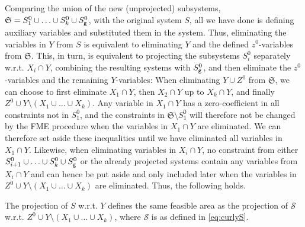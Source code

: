 \normalsize{Comparing the union of the new (unprojected) subsystems, $\mathfrak{S} = S_1^0\cup\ldots\cup S_k^0\cup S_{\texttt{g}}^0$, with the original system $S$, all we have done is defining auxiliary variables and substituted them in the system. Thus, eliminating the variables in $Y$ from $S$ is equivalent to eliminating $Y$ and the defined $z^0$-variables from $\mathfrak{S}$.} This, in turn, is equivalent to projecting the subsystems $S^0_i$ separately w.r.t. $X_i\cap Y$, combining the resulting systems with $S^0_{\texttt{g}}$, and then eliminate the $z^0$-variables and the remaining $Y$-variables: %
%
When eliminating $Y\cup Z^0$ from $\mathfrak{S}$, we can choose to first eliminate $X_1\cap Y$, then $X_2\cap Y$ up to $X_k\cap Y$, and finally $Z^0\cup Y\setminus(X_1\cup \ldots\cup X_k)$. 
Any variable in $X_1\cap Y$ has a zero-coefficient in all constraints not in $S^0_1$, and the constraints in $\mathfrak{S}\setminus S^0_1$ will therefore not be changed by the FME procedure when the variables in $X_1\cap Y$ are eliminated.  We can therefore set aside these inequalities until we have eliminated all variables in $X_1\cap Y$. Likewise, when eliminating variables in $X_i\cap Y$, no constraint from either $S_{i+1}^0\cup \ldots \cup S_k^0\cup S_{\texttt{g}}^0$ or the already projected systems contain any variables from $X_i\cap Y$ and can hence be put aside and only included later when the variables in $Z^0\cup Y\setminus(X_1\cup \ldots\cup X_k)$ are eliminated. Thus, the following holds. 
\begin{prop}
{The projection of $S$ w.r.t. $Y$ defines the same feasible area as 
the projection of $\mathcal{S}$ w.r.t. $Z^0 \cup Y\setminus (X_1\cup \ldots \cup X_k)$, where
$\mathcal{S}$ is as defined in \ref{eq:curlyS}.%
}
\end{prop}

